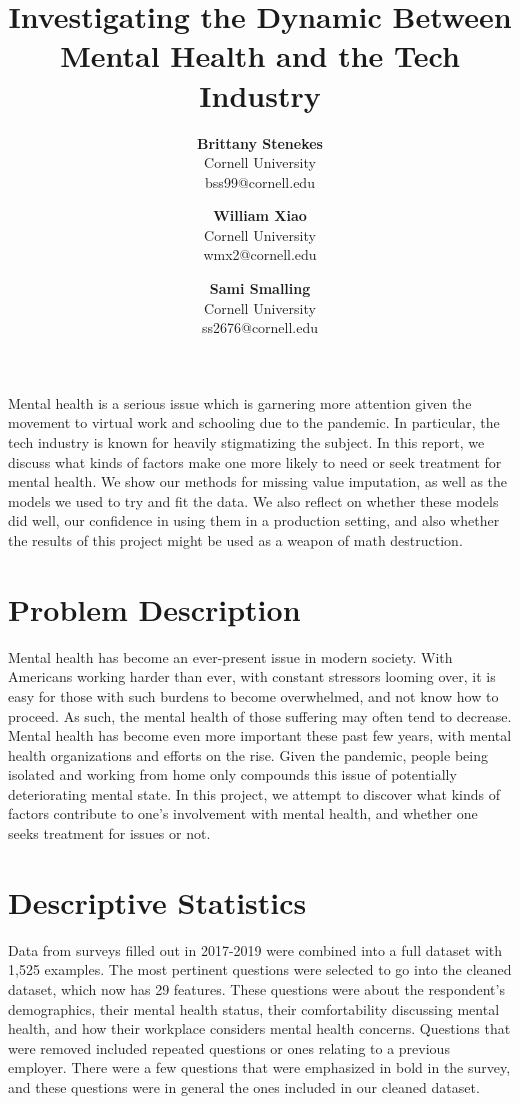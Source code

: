 \documentclass[times, twocolumn]{article}
\title{\textbf{{\Large Investigating the Dynamic Between Mental Health and the Tech Industry}}}
\author{
    \normalsize
    \textbf{Brittany Stenekes} \\
    \normalsize
    Cornell University \\
    \normalsize
    {\fontfamily{pcr}\selectfont bss99@cornell.edu }

    \and
    \normalsize
    \normalsize
    \textbf{William Xiao} \\
    \normalsize
    Cornell University \\
    \normalsize
    {\fontfamily{pcr}\selectfont wmx2@cornell.edu }

    \and
    \normalsize
    \textbf{Sami Smalling} \\
    \normalsize
    Cornell University \\
    \normalsize
    {\fontfamily{pcr}\selectfont ss2676@cornell.edu }
}
\date{}
\renewenvironment{abstract}
 {\large
  \begin{center}
  \bfseries \abstractname\vspace{-.5em}\vspace{0pt}
  \end{center}
    \small
  \list{}{%
    \setlength{\leftmargin}{5mm}%
    \setlength{\rightmargin}{\leftmargin}%
  }%
  \item\relax}
 {\endlist}
\begin{document}
\maketitle


\begin{abstract}
Mental health is a serious issue which is garnering more attention given the
movement to virtual work and schooling due to the pandemic. In particular, the
tech industry is known for heavily stigmatizing the subject. In this report, we
discuss what kinds of factors make one more likely to need or seek treatment for
mental health. We show our methods for missing value imputation, as well as the
models we used to try and fit the data. We also reflect on whether these models
did well, our confidence in using them in a production setting, and also whether
the results of this project might be used as a weapon of math destruction.
\end{abstract}

\fontsize{9.5}{9}\selectfont

\fontsize{10}{12}\selectfont

\section{Problem Description}
Mental health has become an ever-present issue in modern society. With Americans
working harder than ever, with constant stressors looming over, it is easy for
those with such burdens to become overwhelmed, and not know how to proceed.
As such, the mental health of those suffering may often tend to decrease. Mental
health has become even more important these past few years, with mental health
organizations and efforts on the rise. Given the pandemic, people being isolated
and working from home only compounds this issue of potentially deteriorating mental
state. In this project, we attempt to discover what kinds of factors contribute
to one’s involvement with mental health, and whether one seeks treatment for
issues or not.

\section{Descriptive Statistics}

Data from surveys filled out in 2017-2019 were combined into a full dataset with
1,525 examples. The most pertinent questions were selected to go into the cleaned
dataset, which now has 29 features. These questions were about the respondent’s
demographics, their mental health status, their comfortability discussing mental
health, and how their workplace considers mental health concerns. Questions
that were removed included repeated questions or ones relating to a previous
employer. There were a few questions that were emphasized in bold in the survey,
and these questions were in general the ones included in our cleaned dataset.
\end{document}
